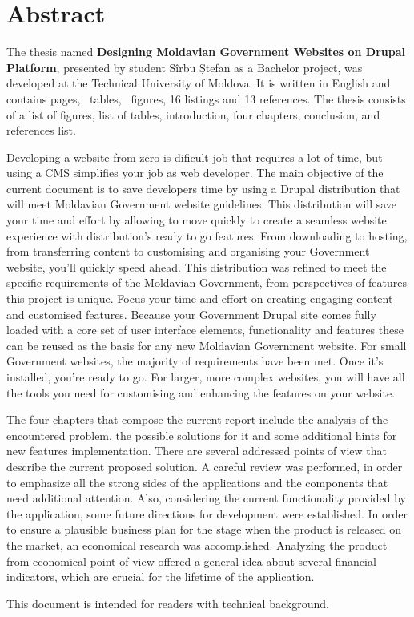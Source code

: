 \section*{Abstract}
The thesis named \textbf{Designing Moldavian Government Websites on Drupal Platform}, presented by student Sîrbu Ștefan as a Bachelor project, was developed at the Technical University of Moldova. It is written in English and contains \pageref{LastPage} pages, \totaltables\ tables, \totalfigures\ figures, 16 listings and 13 references. The thesis consists of a list of figures, list of tables, introduction, four chapters, conclusion, and references list.

Developing a website from zero is dificult job that requires a lot of time, but using a CMS simplifies your job as web developer. The main objective of the current document is to save developers time by using a Drupal distribution that will meet Moldavian Government website guidelines. This distribution will save your time and effort by allowing to move quickly to create a seamless website experience with distribution’s ready to go features. From downloading to hosting, from transferring content to customising and organising your Government website, you’ll quickly speed ahead. This distribution was refined to meet the specific requirements of the Moldavian Government, from perspectives of features this project is unique. Focus your time and effort on creating engaging content and customised features. Because your Government Drupal site comes fully loaded with a core set of user interface elements, functionality and features these can be reused as the basis for any new Moldavian Government website. For small Government websites, the majority of requirements have been met. Once it’s installed, you’re ready to go. For larger, more complex websites, you will have all the tools you need for customising and enhancing the features on your website.

The four chapters that compose the current report include the analysis of the encountered problem, the possible solutions for it and some additional hints for new features implementation. There are several addressed points of view that describe the current proposed solution. A careful review was performed, in order to emphasize all the strong sides of the applications and the components that need additional attention. Also, considering the current functionality provided by the application, some future directions for development were established. In order to ensure a plausible business plan for the stage when the product is released on the market, an economical research was accomplished. Analyzing the product from economical point of view offered a general idea about several financial indicators, which are crucial for the lifetime of the application.

This document is intended for readers with technical background.


